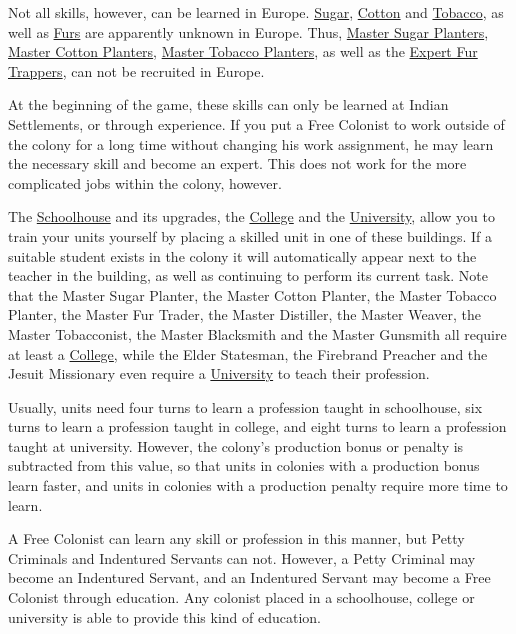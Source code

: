 \documentclass[12pt]{book}
\begin{document}
Not all skills, however, can be learned in Europe.
\hyperlink{Sugar}{Sugar}, \hyperlink{Cotton}{Cotton} and
\hyperlink{Tobacco}{Tobacco}, as well as \hyperlink{Furs}{Furs} are
apparently unknown in Europe. Thus, \hyperlink{Master Sugar
Planter}{Master Sugar Planters}, \hyperlink{Master Cotton
Planter}{Master Cotton Planters}, \hyperlink{Master Tobacco
Planter}{Master Tobacco Planters}, as well as the \hyperlink{Expert
Fur Trapper}{Expert Fur Trappers}, can not be recruited in Europe.

At the beginning of the game, these skills can only be learned at
Indian Settlements, or through experience. If you put a Free Colonist
to work outside of the colony for a long time without changing his
work assignment, he may learn the necessary skill and become an
expert. This does not work for the more complicated jobs within the
colony, however.

The \hyperlink{Schoolhouse}{Schoolhouse} and its upgrades, the
\hyperlink{College}{College} and the
\hyperlink{University}{University}, allow you to train your units
yourself by placing a skilled unit in one of these buildings.  If a
suitable student exists in the colony it will automatically appear
next to the teacher in the building, as well as continuing to perform
its current task.  Note that the Master Sugar Planter, the Master
Cotton Planter, the Master Tobacco Planter, the Master Fur Trader,
the Master Distiller, the Master Weaver, the Master Tobacconist, the
Master Blacksmith and the Master Gunsmith all require at least a
\hyperlink{College}{College}, while the Elder Statesman, the Firebrand
Preacher and the Jesuit Missionary even require a
\hyperlink{University}{University} to teach their profession.

Usually, units need four turns to learn a profession taught in
schoolhouse, six turns to learn a profession taught in college, and
eight turns to learn a profession taught at university. However, the
colony's production bonus or penalty is subtracted from this value, so
that units in colonies with a production bonus learn faster, and units
in colonies with a production penalty require more time to learn.

A Free Colonist can learn any skill or profession in this manner, but
Petty Criminals and Indentured Servants can not.  However, a Petty
Criminal may become an Indentured Servant, and an Indentured Servant
may become a Free Colonist through education. Any colonist placed in a
schoolhouse, college or university is able to provide this kind of
education.
\end{document}
